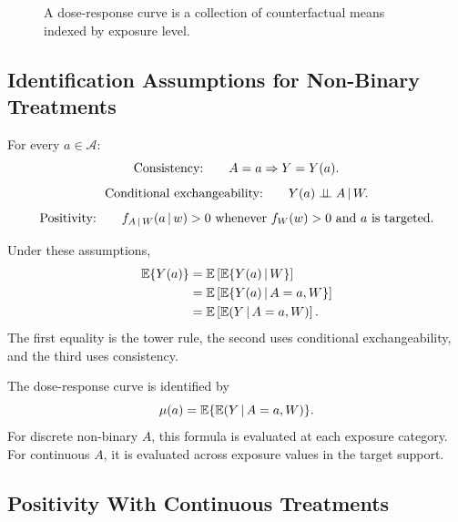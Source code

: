 \begin{figure}[H]
\centering
{}
\caption{A dose-response curve is a collection of counterfactual means indexed by exposure level.}
\label{fig:ch9-dose-response}
\end{figure}

\subsection{Identification Assumptions for Non-Binary Treatments}

\begin{assumptionbox}
For every $a\in\mathcal{A}$:
\[
  \text{Consistency:}\qquad A=a\Rightarrow Y=Y(a).
\]
\[
  \text{Conditional exchangeability:}\qquad Y(a)\perp\!\!\!\perp A\,\vert\, W.
\]
\[
  \text{Positivity:}\qquad f_{A\,\vert\, W}(a\,\vert\, w)>0
  \text{ whenever } f_W(w)>0
  \text{ and } a \text{ is targeted}.
\]
\end{assumptionbox}

Under these assumptions,
\[
\begin{aligned}
  \mathbb{E}\{Y(a)\}
  &=\mathbb{E}\left[\mathbb{E}\{Y(a)\,\vert\, W\}\right]\\
  &=\mathbb{E}\left[\mathbb{E}\{Y(a)\,\vert\, A=a,W\}\right]\\
  &=\mathbb{E}\left[\mathbb{E}(Y\,\vert\, A=a,W)\right].
\end{aligned}
\]
The first equality is the tower rule, the second uses conditional
exchangeability, and the third uses consistency.

\begin{identificationbox}
The dose-response curve is identified by
\[
  \mu(a)=\mathbb{E}\{\mathbb{E}(Y\,\vert\, A=a,W)\}.
\]
For discrete non-binary $A$, this formula is evaluated at each exposure category.
For continuous $A$, it is evaluated across exposure values in the target support.
\end{identificationbox}

\subsection{Positivity With Continuous Treatments}

